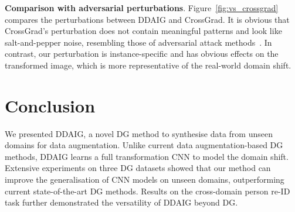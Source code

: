 \documentclass[letterpaper]{article}
\newcommand{\keypoint}[1]{\vspace{0.1cm}\noindent\textbf{#1}}
\begin{document}
\keypoint{Comparison with adversarial perturbations}.
Figure~\ref{fig:vs_crossgrad} compares the perturbations between DDAIG and CrossGrad. It is obvious that CrossGrad's perturbation does not contain meaningful patterns and look like salt-and-pepper noise, resembling those of adversarial attack methods~\cite{goodfellow2014generative}. In contrast, our perturbation is instance-specific and has obvious effects on the transformed image, which is more representative of the real-world domain shift.



\section{Conclusion} \label{sec:conclusion}
We presented DDAIG, a novel DG method to synthesise data from unseen domains for data augmentation. Unlike current data augmentation-based DG methods, DDAIG learns a full transformation CNN to model the domain shift. Extensive experiments on three DG datasets showed that our method can improve the generalisation of CNN models on unseen domains, outperforming current state-of-the-art DG methods. Results on the cross-domain person re-ID task further demonstrated the versatility of DDAIG beyond DG.



{\small


}
\end{document}
